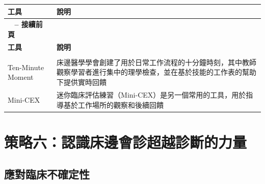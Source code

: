 \documentclass[12pt,a4paper]{article}
\begin{document}
\begin{longtable}{>{\raggedright\arraybackslash}p{4cm} >{\raggedright\arraybackslash}p{11cm}}
\toprule
\textbf{\textcolor{emergency_blue}{工具}} & \textbf{\textcolor{emergency_blue}{說明}} \\
\midrule
\endfirsthead

\multicolumn{2}{c}%
{{\bfseries \tablename\ \thetable{} -- 接續前頁}} \\
\toprule
\textbf{\textcolor{emergency_blue}{工具}} & \textbf{\textcolor{emergency_blue}{說明}} \\
\midrule
\endhead

\midrule \multicolumn{2}{r}{{接續下頁}} \\ \midrule
\endfoot

\bottomrule
\endlastfoot

\textcolor{emergency_red}{Ten-Minute Moment} & 床邊醫學學會創建了用於日常工作流程的十分鐘時刻，其中教師觀察學習者進行集中的理學檢查，並在基於技能的工作表的幫助下提供實時回饋 \\

\textcolor{emergency_red}{Mini-CEX} & 迷你臨床評估練習（Mini-CEX）是另一個常用的工具，用於指導基於工作場所的觀察和後續回饋 \\
\end{longtable}

\section{策略六：認識床邊會診超越診斷的力量}

\subsection{應對臨床不確定性}
\end{document}
